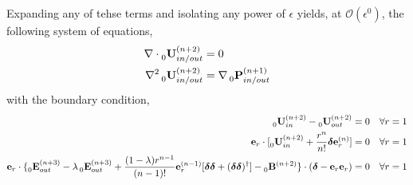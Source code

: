 Expanding any of tehse terms and isolating any power of $\epsilon$ yields, at $\mathcal{O}(\epsilon^0)$, the following system of equations, 
\begin{align*}
    \mathbf{\nabla}\cdot \prescript{}{0}{\textbf{U}}_{in/out}^{(n+2)} &= 0 \\
    \mathbf{\nabla}^2\prescript{}{0}{\textbf{U}}_{in/out}^{(n+2)} &= \mathbf{\nabla} \prescript{}{0}{\textbf{P}}_{in/out}^{(n+1)} \\
\end{align*}
with the boundary condition, 
\begin{align}
    \prescript{}{0}{\textbf{U}}_{in}^{(n+2)} - \prescript{}{0}{\textbf{U}}_{out}^{(n+2)}
    &=
    0
    &&\forall r = 1 
    \\
    \textbf{e}_r\cdot [\prescript{}{0}{\textbf{U}}_{in}^{(n+2)} 
    +\frac{r^n}{n!}\bm\delta \textbf{e}_r^{(n)}] &= 0 
    &&\forall r = 1 \\
    \textbf{e}_r\cdot \{
        \prescript{}{0}{\textbf{E}}_{out}^{(n+3)}
        -\lambda\prescript{}{0}{\textbf{E}}_{out}^{(n+3)}
        +\frac{(1-\lambda)r^{n-1}}{(n-1)!}
        \textbf{e}_r^{(n-1)}[\bm\delta\bm\delta + (\bm\delta\bm\delta)^\dagger]
        - \prescript{}{0}{\textbf{B}}^{(n+2)}
    \}\cdot (\bm\delta - \textbf{e}_r \textbf{e}_r)
    &=
    0
    &&\forall r = 1
\end{align}


